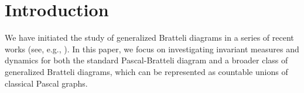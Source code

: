 \documentclass[11pt, twoside]{amsart}
\theoremstyle{definition}
\theoremstyle{remark}
\newtheorem{quest}[definition]{Question}
\theoremstyle{plain}
\numberwithin{equation}{section}
\newcommand{\ie}{\emph{i.e.}}
\begin{document}
\maketitle








\section{Introduction}

We have initiated the study of generalized Bratteli diagrams in a series of recent works (see, e.g., \cite{BezuglyiDooleyKwiatkowski2006, BezuglyiJorgensenSanadhya2024, BezuglyiJorgensenKarpelSanadhya2023, BezuglyiKarpelKwiatkowski2024, BezuglyiKarpelKwiatkowskiWata2024}). In this paper, we focus on investigating invariant measures and dynamics for both the standard Pascal-Bratteli diagram and a broader class of generalized Bratteli diagrams, which can be represented as countable unions of classical Pascal graphs.
\end{document}
